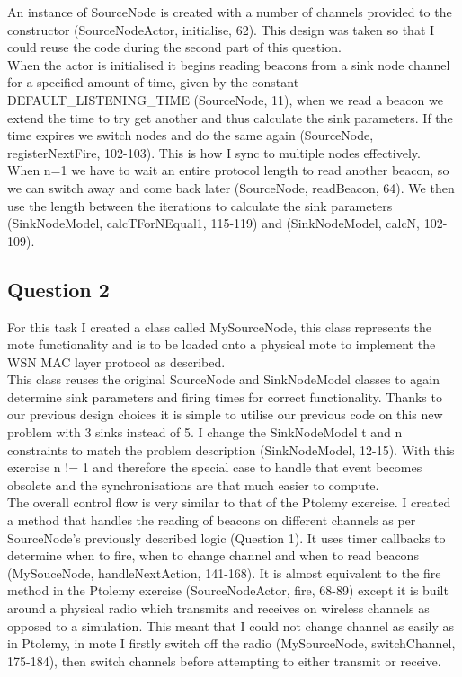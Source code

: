 \documentclass[12pt]{article} %
\begin{document}
An instance of SourceNode is created with a number of channels provided to the constructor (SourceNodeActor, initialise, 62). This design was taken so that I could reuse the code during the second part of this question.
\\

When the actor is initialised it begins reading beacons from a sink node channel for a specified amount of time, given by the constant DEFAULT\_LISTENING\_TIME (SourceNode, 11), when we read a beacon we extend the time to try get another and thus calculate the sink parameters. If the time expires we switch nodes and do the same again (SourceNode, registerNextFire, 102-103). This is how I sync to multiple nodes effectively.
\\

When n=1 we have to wait an entire protocol length to read another beacon, so we can switch away and come back later (SourceNode, readBeacon, 64). We then use the length between the iterations to calculate the sink parameters (SinkNodeModel, calcTForNEqual1, 115-119) and (SinkNodeModel, calcN, 102-109).


\subsection{Question 2} %
For this task I created a class called MySourceNode, this class represents the mote functionality and is to be loaded onto a physical mote to implement the WSN MAC layer protocol as described.
\\

This class reuses the original SourceNode and SinkNodeModel classes to again determine sink parameters and firing times for correct functionality. Thanks to our previous design choices it is simple to utilise our previous code on this new problem with 3 sinks instead of 5. I change the SinkNodeModel t and n constraints to match the problem description (SinkNodeModel, 12-15). With this exercise n != 1 and therefore the special case to handle that event becomes obsolete and the synchronisations are that much easier to compute.
\\

The overall control flow is very similar to that of the Ptolemy exercise. I created a method that handles the reading of beacons on different channels as per SourceNode's previously described logic (Question 1). It uses timer callbacks to determine when to fire, when to change channel and when to read beacons (MySouceNode, handleNextAction, 141-168). It is almost equivalent to the fire method in the Ptolemy exercise (SourceNodeActor, fire, 68-89) except it is built around a physical radio which transmits and receives on wireless channels as opposed to a simulation. This meant that I could not change channel as easily as in Ptolemy, in mote I firstly switch off the radio (MySourceNode, switchChannel, 175-184), then switch channels before attempting to either transmit or receive.
\\
\end{document}
